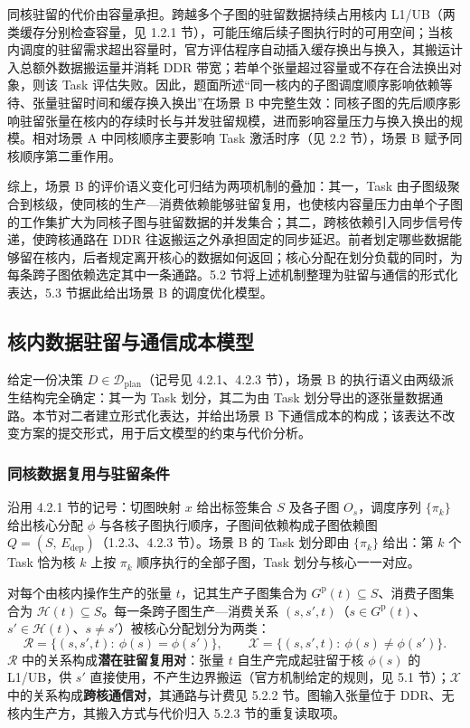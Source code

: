 同核驻留的代价由容量承担。跨越多个子图的驻留数据持续占用核内 L1/UB（两类缓存分别检查容量，见 1.2.1 节），可能压缩后续子图执行时的可用空间；当核内调度的驻留需求超出容量时，官方评估程序自动插入缓存换出与换入，其搬运计入总额外数据搬运量并消耗 DDR 带宽；若单个张量超过容量或不存在合法换出对象，则该 Task 评估失败。因此，题面所述“同一核内的子图调度顺序影响依赖等待、张量驻留时间和缓存换入换出”在场景 B 中完整生效：同核子图的先后顺序影响驻留张量在核内的存续时长与并发驻留规模，进而影响容量压力与换入换出的规模。相对场景 A 中同核顺序主要影响 Task 激活时序（见 2.2 节），场景 B 赋予同核顺序第二重作用。

综上，场景 B 的评价语义变化可归结为两项机制的叠加：其一，Task 由子图级聚合到核级，使同核的生产—消费依赖能够驻留复用，也使核内容量压力由单个子图的工作集扩大为同核子图与驻留数据的并发集合；其二，跨核依赖引入同步信号传递，使跨核通路在 DDR 往返搬运之外承担固定的同步延迟。前者划定哪些数据能够留在核内，后者规定离开核心的数据如何返回；核心分配在划分负载的同时，为每条跨子图依赖选定其中一条通路。5.2 节将上述机制整理为驻留与通信的形式化表达，5.3 节据此给出场景 B 的调度优化模型。

\subsection{核内数据驻留与通信成本模型}
给定一份决策 $D\in\mathcal{D}_{\mathrm{plan}}$（记号见 4.2.1、4.2.3 节），场景 B 的执行语义由两级派生结构完全确定：其一为 Task 划分，其二为由 Task 划分导出的逐张量数据通路。本节对二者建立形式化表达，并给出场景 B 下通信成本的构成；该表达不改变方案的提交形式，用于后文模型的约束与代价分析。

\subsubsection{同核数据复用与驻留条件}
沿用 4.2.1 节的记号：切图映射 $x$ 给出标签集合 $S$ 及各子图 $O_s$，调度序列 $\{\pi_k\}$ 给出核心分配 $\phi$ 与各核子图执行顺序，子图间依赖构成子图依赖图 $Q=(S,\,E_{\mathrm{dep}})$（1.2.3、4.2.3 节）。场景 B 的 Task 划分即由 $\{\pi_k\}$ 给出：第 $k$ 个 Task 恰为核 $k$ 上按 $\pi_k$ 顺序执行的全部子图，Task 划分与核心一一对应。

对每个由核内操作生产的张量 $t$，记其生产子图集合为 $G^{\mathrm{p}}(t)\subseteq S$、消费子图集合为 $\mathcal{H}(t)\subseteq S$。每一条跨子图生产—消费关系 $(s,s',t)$（$s\in G^{\mathrm{p}}(t)$、$s'\in\mathcal{H}(t)$、$s\neq s'$）被核心分配划分为两类：
\[ \mathcal{R}=\{(s,s',t):\ \phi(s)=\phi(s')\},\qquad \mathcal{X}=\{(s,s',t):\ \phi(s)\neq\phi(s')\}. \]
$\mathcal{R}$ 中的关系构成\textbf{潜在驻留复用对}：张量 $t$ 自生产完成起驻留于核 $\phi(s)$ 的 L1/UB，供 $s'$ 直接使用，不产生边界搬运（官方机制给定的规则，见 5.1 节）；$\mathcal{X}$ 中的关系构成\textbf{跨核通信对}，其通路与计费见 5.2.2 节。图输入张量位于 DDR、无核内生产方，其搬入方式与代价归入 5.2.3 节的重复读取项。

